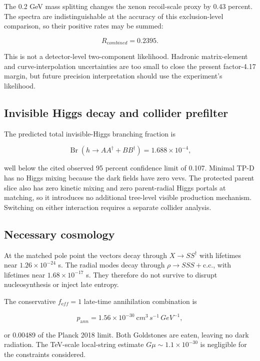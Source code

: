 \documentclass[
]{article}
\begin{document}
The 0.2 GeV mass splitting changes the xenon recoil-scale proxy by 0.43
percent. The spectra are indistinguishable at the accuracy of this
exclusion-level comparison, so their positive rates may be summed:

\[
R_{\mathrm combined}=0.2395.
\]

This is not a detector-level two-component likelihood. Hadronic
matrix-element and curve-interpolation uncertainties are too small to
close the present factor-4.17 margin, but future precision
interpretation should use the experiment's likelihood.

\hypertarget{invisible-higgs-decay-and-collider-prefilter}{%
\subsection{Invisible Higgs decay and collider
prefilter}\label{invisible-higgs-decay-and-collider-prefilter}}

The predicted total invisible-Higgs branching fraction is

\[
\operatorname{Br}(h\to AA^\dagger+BB^\dagger)=1.688\times10^{-4},
\]

well below the cited observed 95 percent confidence limit of 0.107.
Minimal TP-D has no Higgs mixing because the dark fields have zero vevs.
The protected parent slice also has zero kinetic mixing and zero
parent-radial Higgs portals at matching, so it introduces no additional
tree-level visible production mechanism. Switching on either interaction
requires a separate collider analysis.

\hypertarget{necessary-cosmology}{%
\subsection{Necessary cosmology}\label{necessary-cosmology}}

At the matched pole point the vectors decay through \(X\to SS^\dagger\)
with lifetimes near \(1.26\times10^{-24}\) s. The radial modes decay
through \(\rho\to SSS+\mathrm{c.c.}\), with lifetimes near
\(1.68\times10^{-17}\) s. They therefore do not survive to disrupt
nucleosynthesis or inject late entropy.

The conservative \(f_{\mathrm eff}=1\) late-time annihilation
combination is

\[
p_{\mathrm ann}=1.56\times10^{-30}\ {\mathrm cm^3\,s^{-1}\,GeV^{-1}},
\]

or 0.00489 of the Planck 2018 limit. Both Goldstones are eaten, leaving
no dark radiation. The TeV-scale local-string estimate
\(G\mu\sim1.1\times10^{-30}\) is negligible for the constraints
considered.
\end{document}

